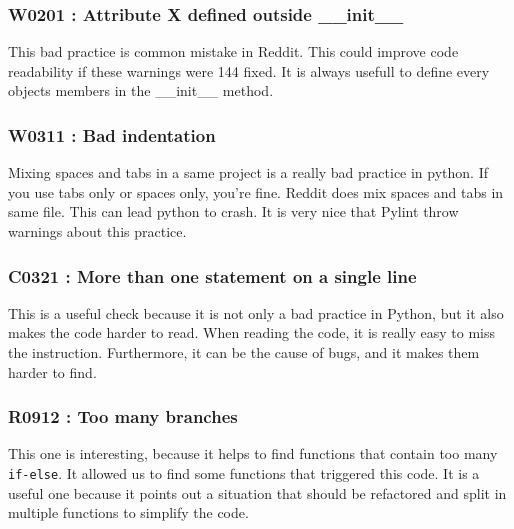 \documentclass[11pt, a4paper]{article}
\newcommand{\pyl}{\textsf{Pylint}}
\begin{document}
\subsubsection*{W0201 : Attribute X defined outside \_\_init\_\_}

This bad practice is common mistake in Reddit.
This could improve code readability if these warnings were 144 fixed.
It is always usefull to define every objects members in the \_\_init\_\_ method.

\subsubsection*{W0311 : Bad indentation}

Mixing spaces and tabs in a same project is a really bad practice in python.
If you use tabs only or spaces only, you're fine.
Reddit does mix spaces and tabs in same file. 
This can lead python to crash.
It is very nice that \pyl{} throw warnings about this practice.


\subsubsection*{C0321 : More than one statement on a single line}
This is a useful check because it is not only a bad practice in Python, but it also makes the code harder to read.
When reading the code, it is really easy to miss the instruction.
Furthermore, it can be the cause of bugs, and it makes them harder to find.


\subsubsection*{R0912 : Too many branches}
This one is interesting, because it helps to find functions that contain too many \lstinline|if-else|.
It allowed us to find some functions that triggered this code.
It is a useful one because it points out a situation that should be refactored and split in multiple functions to simplify the code.
\end{document}
